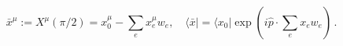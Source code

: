 \begin{equation}
\bar{x}^{\mu }:=X^{\mu }\left( \pi /2\right) =x_{0}^{\mu
}-\sum_{e}x_{e}^{\mu }w_{e},\quad \langle \bar{x}|=\langle x_{0}|\exp
\left( i\hat{p}\cdot \sum_{e}x_{e}w_{e}\right)\,.  \label{midpoint}
\end{equation}

